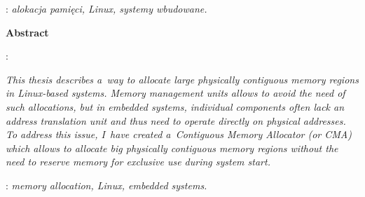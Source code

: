 \begin{titlepage}
    : {\itshape alokacja pamięci, Linux,
      systemy wbudowane.}
    \par
    \vspace{4\baselineskip}
    \begin{center}
	{\large\bfseries Abstract}\par\bigskip
    \end{center}
    : {\itshape \theengishtitle}\par
    \vspace*{1\baselineskip}

    {\itshape This thesis describes a~way to allocate large physically
      contiguous memory regions in Linux-based systems.  Memory
      management units allows to avoid the need of such allocations,
      but in embedded systems, individual components often lack an
      address translation unit and thus need to operate directly on
      physical addresses.  To address this issue, I~have created
      a~Contiguous Memory Allocator (or CMA) which allows to allocate
      big physically contiguous memory regions without the need to
      reserve memory for exclusive use during system start.}
    \vspace*{1\baselineskip}

    : {\itshape memory allocation, Linux,
      embedded systems.}

\end{titlepage}
